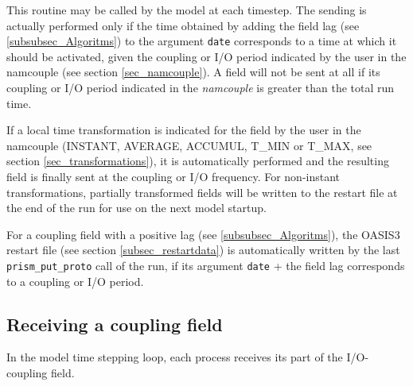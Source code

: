 This routine may be called by the model at each timestep. The sending
is actually performed only if the time obtained by adding the field
lag (see \ref{subsubsec_Algoritms}) to the argument {\tt date}
corresponds to a time at which it should be activated, given the
coupling or I/O period indicated by the user in the namcouple (see
section \ref{sec_namcouple}). A field will not be sent at all if its
coupling or I/O period indicated in the {\it namcouple} is greater
than the total run time.

If a local time transformation is indicated for the field by
the user in the namcouple (INSTANT, AVERAGE, ACCUMUL, T\_MIN or T\_MAX,
see section \ref{sec_transformations}), it is automatically performed
and the resulting field is finally sent at the coupling or I/O
frequency.  For non-instant transformations, partially transformed
fields will be written to the restart file at the end of the run
for use on the next model startup.

For a coupling field with a positive lag (see
\ref{subsubsec_Algoritms}), the OASIS3 restart file (see section
\ref{subsec_restartdata}) is automatically written by the
last {\tt prism\_put\_proto} call of the run, if its argument {\tt date}
+ the field lag corresponds to a coupling or I/O period. 

\subsection{Receiving a coupling field}

In the model time stepping loop, each process
receives its part of the I/O-coupling field. 

